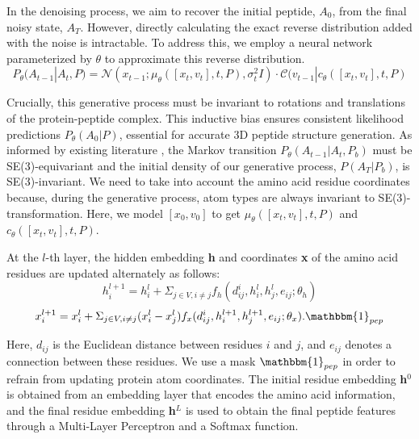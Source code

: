 \vspace{3pt} \noindent
In the denoising process, we aim to recover the initial peptide, $A_0$, from the final noisy state, $A_T$. However, directly calculating the exact reverse distribution added with the noise is intractable. To address this, we employ a neural network parameterized by $\theta$ to approximate this reverse distribution.
$$P_{\theta}(A_{t-1}|A_t, P)=\mathcal{N}(x_{t-1};\mu_{\theta}([x_t, v_t], t, P), \sigma_t^2I) \cdot \mathcal{C}(v_{t-1}|c_\theta([x_t, v_t], t, P)$$

\vspace{3pt} \noindent
Crucially, this generative process must be invariant to rotations and translations of the protein-peptide complex. This inductive bias ensures consistent likelihood predictions $P_{\theta}(A_0|P)$, essential for accurate 3D peptide structure generation. As informed by existing literature \cite{kohler2020equivariant, xu2022geodiff}, the Markov transition $P_\theta(A_{t-1} |A_t, P_b)$ must be SE(3)-equivariant and the initial density of our generative process, $P(A_T|P_b)$, is SE(3)-invariant. We need to take into account the amino acid residue coordinates because, during the generative process, atom types are always invariant to SE(3)-transformation. Here, we model $[x_0, v_0]$ to get $\mu_{\theta}([x_t, v_t], t, P)$ and $c_\theta([x_t, v_t], t, P)$. 

\vspace{3pt} \noindent
At the $l$-th layer, the hidden embedding \textbf{h} and coordinates \textbf{x} of the amino acid residues are updated alternately as follows:
$$h_i^{l+1} = h_i^l + \Sigma_{j \in V, i\neq j}  f_h(d_{ij}^i, h_i^l, h_j^l, e_{ij}; \theta_h)$$
$$x_i^{l+1} = x_i^l + \Sigma_{j \in V, i\neq j} (x_i^l - x_j^l)  f_x(d_{ij}^i, h_i^{l+1}, h_j^{l+1}, e_{ij}; \theta_x).\mathbbm{1}_{pep}$$

\vspace{3pt} \noindent
Here, $d_{ij}$ is the Euclidean distance between residues $i$ and $j$, and $e_{ij}$ denotes a connection between these residues. We use a mask $\mathbbm{1}_{pep}$ in order to refrain from updating protein atom coordinates. The initial residue embedding \textbf{h$^0$} is obtained from an embedding layer that encodes the amino acid information, and the final residue embedding \textbf{h$^L$} is used to obtain the final peptide features through a Multi-Layer Perceptron and a Softmax function.

